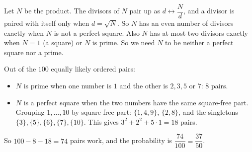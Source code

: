 Let $N$ be the product. The divisors of $N$ pair up as $d\leftrightarrow\dfrac Nd$, and a divisor is paired with itself only when $d=\sqrt N$. So $N$ has an even number of divisors exactly when $N$ is not a perfect square. Also $N$ has at most two divisors exactly when $N=1$ (a square) or $N$ is prime. So we need $N$ to be neither a perfect square nor a prime.

Out of the $100$ equally likely ordered pairs:
\begin{itemize}
\item $N$ is prime when one number is $1$ and the other is $2,3,5$ or $7$: $8$ pairs.
\item $N$ is a perfect square when the two numbers have the same square-free part. Grouping $1,\dots,10$ by square-free part: $\{1,4,9\}$, $\{2,8\}$, and the singletons $\{3\},\{5\},\{6\},\{7\},\{10\}$. This gives $3^2+2^2+5\cdot1=18$ pairs.
\end{itemize}
So $100-8-18=74$ pairs work, and the probability is $\dfrac{74}{100}=\boxed{\dfrac{37}{50}}$.
